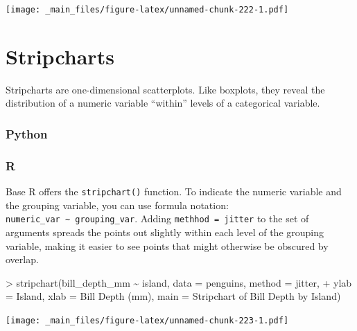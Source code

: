 \documentclass[
]{book}
\newenvironment{Shaded}{\begin{snugshade}}{\end{snugshade}}
\newcommand{\AttributeTok}[1]{\textcolor[rgb]{0.77,0.63,0.00}{#1}}
\newcommand{\FunctionTok}[1]{\textcolor[rgb]{0.00,0.00,0.00}{#1}}
\newcommand{\NormalTok}[1]{#1}
\newcommand{\SpecialCharTok}[1]{\textcolor[rgb]{0.00,0.00,0.00}{#1}}
\newcommand{\StringTok}[1]{\textcolor[rgb]{0.31,0.60,0.02}{#1}}
\begin{document}
\texttt{[image: \_main\_files/figure-latex/unnamed-chunk-222-1.pdf]}

\hypertarget{stripcharts}{%
\section{Stripcharts}\label{stripcharts}}

Stripcharts are one-dimensional scatterplots. Like boxplots, they reveal the distribution of a numeric variable ``within'' levels of a categorical variable.

\hypertarget{python-41}{%
\subsubsection*{Python}\label{python-41}}

\hypertarget{r-41}{%
\subsubsection*{R}\label{r-41}}

Base R offers the \texttt{stripchart()} function. To indicate the numeric variable and the grouping variable, you can use formula notation: \texttt{numeric\_var\ \textasciitilde{}\ grouping\_var}. Adding \texttt{methhod\ =\ \textquotesingle{}jitter\textquotesingle{}} to the set of arguments spreads the points out slightly within each level of the grouping variable, making it easier to see points that might otherwise be obscured by overlap.

\begin{Shaded}
\begin{Highlighting}[]
\SpecialCharTok{\textgreater{}} \FunctionTok{stripchart}\NormalTok{(bill\_depth\_mm }\SpecialCharTok{\textasciitilde{}}\NormalTok{ island, }\AttributeTok{data =}\NormalTok{ penguins, }\AttributeTok{method =} \StringTok{\textquotesingle{}jitter\textquotesingle{}}\NormalTok{,}
\SpecialCharTok{+}            \AttributeTok{ylab =} \StringTok{\textquotesingle{}Island\textquotesingle{}}\NormalTok{, }\AttributeTok{xlab =} \StringTok{\textquotesingle{}Bill Depth (mm)\textquotesingle{}}\NormalTok{, }\AttributeTok{main =} \StringTok{\textquotesingle{}Stripchart of Bill Depth by Island\textquotesingle{}}\NormalTok{)}
\end{Highlighting}
\end{Shaded}

\texttt{[image: \_main\_files/figure-latex/unnamed-chunk-223-1.pdf]}
\end{document}
